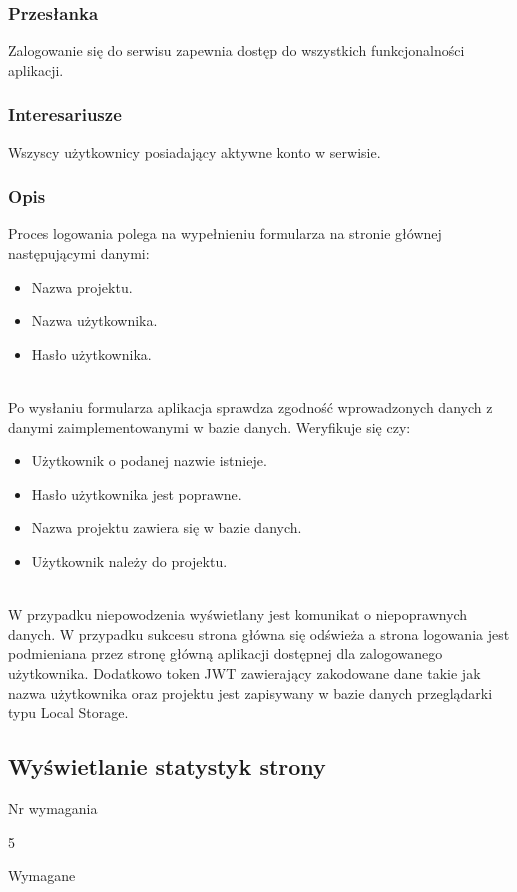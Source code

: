 \documentclass[eng,printmode]{mgr}
\begin{document}
\subsubsection{Przesłanka}
Zalogowanie się do serwisu zapewnia dostęp do wszystkich funkcjonalności aplikacji.

\subsubsection{Interesariusze}
Wszyscy użytkownicy posiadający aktywne konto w serwisie.

\subsubsection{Opis}
Proces logowania polega na wypełnieniu formularza na stronie głównej następującymi danymi:
\begin{itemize}
	\item[--] Nazwa projektu.
	\item[--] Nazwa użytkownika.
	\item[--] Hasło użytkownika.
\end{itemize}
\ \\
Po wysłaniu formularza aplikacja sprawdza zgodność wprowadzonych danych z danymi zaimplementowanymi w bazie danych. Weryfikuje się czy:
\begin{itemize}
	\item[--] Użytkownik o podanej nazwie istnieje.
	\item[--] Hasło użytkownika jest poprawne.
	\item[--] Nazwa projektu zawiera się w bazie danych.
	\item[--] Użytkownik należy do projektu.
\end{itemize}
\ \\
W przypadku niepowodzenia wyświetlany jest komunikat o niepoprawnych danych. W przypadku sukcesu strona główna się odświeża a strona logowania jest podmieniana przez stronę główną aplikacji dostępnej dla zalogowanego użytkownika. Dodatkowo token JWT zawierający zakodowane dane takie jak nazwa użytkownika oraz projektu jest zapisywany w bazie danych przeglądarki typu Local Storage\cite{Keyword_LocaLStorage}.

\subsection{Wyświetlanie statystyk strony}
\begin{labeling}{Nr wymagania}
\item [Nr wymagania:] 5
\item [Priorytet:] Wymagane
\end{labeling}
\end{document}

